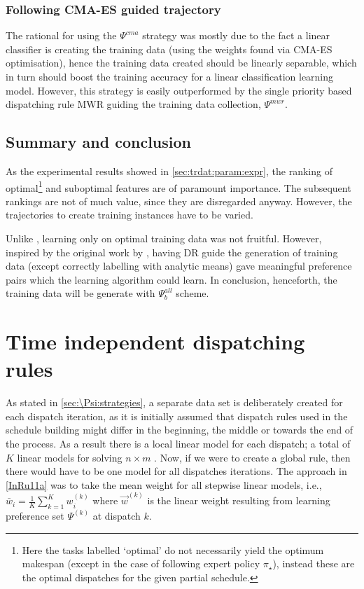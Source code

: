 \subsubsection{Following CMA-ES guided trajectory}
The rational for using the $\Psi^{cma}$ strategy was mostly due to the fact a 
linear classifier is creating the training data (using the weights found via 
CMA-ES optimisation), hence the training data created should be linearly 
separable, which in turn should boost the training accuracy for a linear 
classification learning model. However, this strategy is easily outperformed by 
the single priority based dispatching rule MWR guiding the training data 
collection, $\Psi^{mwr}$. 


\subsection{Summary and conclusion}
As the experimental results showed in \cref{sec:trdat:param:expr}, the ranking 
of optimal\footnote{Here the tasks labelled `optimal' do not necessarily yield 
    the optimum makespan (except in the case of following expert policy 
    $\pi_\star$), instead these are the optimal dispatches for the given 
    partial schedule.} 
and suboptimal features are of paramount importance. The subsequent rankings 
are not of much value, since they are disregarded anyway. However, the 
trajectories to create training instances have to be varied.

Unlike \citep{Siggi10,Malik08,Russell09}, learning only on optimal training 
data was not fruitful. However, inspired by the original work by 
\cite{Siggi05}, having DR guide the generation of training data (except 
correctly labelling with analytic means) gave meaningful preference pairs which 
the learning algorithm could learn. In conclusion, henceforth, the training 
data will be generate with $\Psi_{ b}^{all}$ scheme.



\section{Time independent dispatching rules}\label{sec:pref:scalability}
As stated in \cref{sec:\Psi:strategies}, a separate data set is deliberately 
created for each dispatch iteration, as it is initially assumed that dispatch 
rules used in the schedule building might differ in the beginning, the middle 
or towards the end of the process. As a result there is a local linear model 
for each dispatch; a total of $K$ linear models for solving $n\times m$ 
\jsp. Now, if we were to create a global rule, then there would have to be one 
model for all dispatches iterations. The approach in \cref{InRu11a} was to take 
the mean weight for all stepwise linear models, i.e., 
$\bar{w}_i=\frac{1}{K}\sum_{k=1}^K w_i^{(k)}$ where $\vec{w}^{(k)}$ is 
the linear weight resulting from learning preference set $\Psi^{(k)}$ at 
dispatch $k$. 

